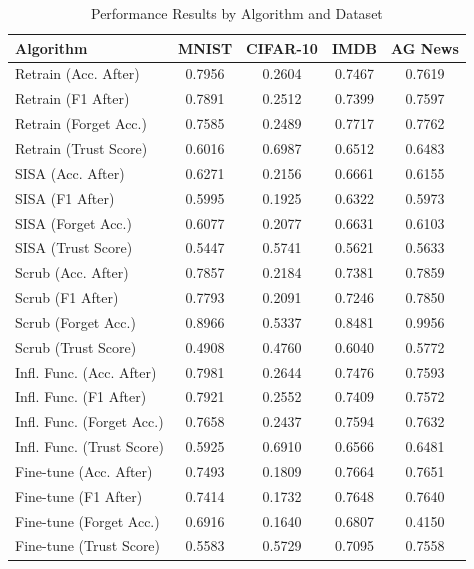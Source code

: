 \begin{table}[t]
\centering
\caption{Performance Results by Algorithm and Dataset}
\label{tab:performance_results}
\small
\begin{tabular}{lcccc}
\toprule
Algorithm & MNIST & CIFAR-10 & IMDB & AG News \\
\midrule
Retrain (Acc. After) & 0.7956 & 0.2604 & 0.7467 & 0.7619 \\
Retrain (F1 After) & 0.7891 & 0.2512 & 0.7399 & 0.7597 \\
Retrain (Forget Acc.) & 0.7585 & 0.2489 & 0.7717 & 0.7762 \\
Retrain (Trust Score) & 0.6016 & 0.6987 & 0.6512 & 0.6483 \\
SISA (Acc. After) & 0.6271 & 0.2156 & 0.6661 & 0.6155 \\
SISA (F1 After) & 0.5995 & 0.1925 & 0.6322 & 0.5973 \\
SISA (Forget Acc.) & 0.6077 & 0.2077 & 0.6631 & 0.6103 \\
SISA (Trust Score) & 0.5447 & 0.5741 & 0.5621 & 0.5633 \\
Scrub (Acc. After) & 0.7857 & 0.2184 & 0.7381 & 0.7859 \\
Scrub (F1 After) & 0.7793 & 0.2091 & 0.7246 & 0.7850 \\
Scrub (Forget Acc.) & 0.8966 & 0.5337 & 0.8481 & 0.9956 \\
Scrub (Trust Score) & 0.4908 & 0.4760 & 0.6040 & 0.5772 \\
Infl. Func. (Acc. After) & 0.7981 & 0.2644 & 0.7476 & 0.7593 \\
Infl. Func. (F1 After) & 0.7921 & 0.2552 & 0.7409 & 0.7572 \\
Infl. Func. (Forget Acc.) & 0.7658 & 0.2437 & 0.7594 & 0.7632 \\
Infl. Func. (Trust Score) & 0.5925 & 0.6910 & 0.6566 & 0.6481 \\
Fine-tune (Acc. After) & 0.7493 & 0.1809 & 0.7664 & 0.7651 \\
Fine-tune (F1 After) & 0.7414 & 0.1732 & 0.7648 & 0.7640 \\
Fine-tune (Forget Acc.) & 0.6916 & 0.1640 & 0.6807 & 0.4150 \\
Fine-tune (Trust Score) & 0.5583 & 0.5729 & 0.7095 & 0.7558 \\
\bottomrule
\end{tabular}
\end{table}
